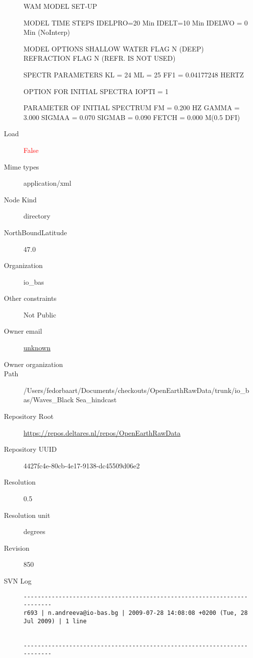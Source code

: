 \documentclass[9]{report}
\begin{document}
\begin{description}
WAM MODEL SET-UP

MODEL TIME STEPS
IDELPRO=20 Min
IDELT=10 Min
IDELWO = 0 Min (NoInterp)

MODEL OPTIONS
SHALLOW WATER FLAG N (DEEP)
REFRACTION FLAG N (REFR. IS NOT USED)

SPECTR PARAMETERS
KL = 24
ML = 25
FF1 = 0.04177248 HERTZ

OPTION FOR INITIAL SPECTRA 
IOPTI = 1

PARAMETER OF INITIAL SPECTRUM   
FM = 0.200 HZ
GAMMA = 3.000
SIGMAA = 0.070
SIGMAB = 0.090
FETCH = 0.000 M(0.5 DFI)
  \item[Load] \textcolor{red}{False}
  \item[Mime types] application/xml
  \item[Node Kind] directory
  \item[NorthBoundLatitude] 47.0
  \item[Organization] io\_bas
  \item[Other constraints] Not Public
  \item[Owner email] \href{mailto:unknown}{unknown}
  \item[Owner organization] 
  \item[Path] /Users/fedorbaart/Documents/checkouts/OpenEarthRawData/trunk/io\_bas/Waves\_Black Sea\_hindcast
  \item[Repository Root] \href{https://repos.deltares.nl/repos/OpenEarthRawData}{https://repos.deltares.nl/repos/OpenEarthRawData}
  \item[Repository UUID] 4427fc4e-80cb-4e17-9138-dc45509d06e2
  \item[Resolution] 0.5
  \item[Resolution unit] degrees
  \item[Revision] 850
  \item[SVN Log] \begin{verbatim}
------------------------------------------------------------------------
r693 | n.andreeva@io-bas.bg | 2009-07-28 14:08:08 +0200 (Tue, 28 Jul 2009) | 1 line


------------------------------------------------------------------------


\end{verbatim}
\end{description}
\end{document}
